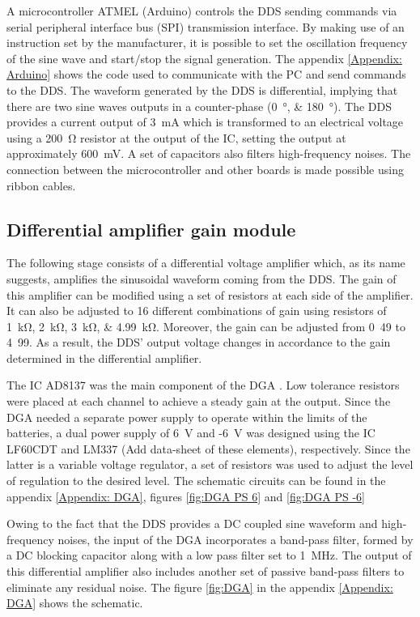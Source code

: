 A microcontroller ATMEL (Arduino) controls the DDS sending commands via serial peripheral interface bus (SPI) transmission interface. By making use of an instruction set by the manufacturer, it is possible to set the oscillation frequency of the sine wave and start/stop the signal generation. The appendix \ref{Appendix: Arduino} shows the code used to communicate with the PC and send commands to the DDS. The waveform generated by the DDS is differential, implying that there are two sine waves outputs in a counter-phase (\SIlist{0;180}{\degree}). The DDS provides a current output of \SI{3}{\mA} which is transformed to an electrical voltage using a \SI{200}{\ohm} resistor at the output of the IC, setting the output at approximately \SI{600}{\mV}. A set of capacitors also filters high-frequency noises. The connection between the microcontroller and other boards is made possible using ribbon cables. 

\subsection{Differential amplifier gain module}
The following stage consists of a differential voltage amplifier which, as its name suggests, amplifies the sinusoidal waveform coming from the DDS. The gain of this amplifier can be modified using a set of resistors at each side of the amplifier. It can also be adjusted to 16 different combinations of gain using resistors of \SIlist{1;2;3;4.99}{\kohm}. Moreover, the gain can be adjusted from \si{0.49} to \si{4.99}. As a result, the DDS' output voltage changes in accordance to the gain determined in the differential amplifier. 

The IC AD8137 was the main component of the DGA \cite{ad:AD8137}. Low tolerance resistors were placed at each channel to achieve a steady gain at the output. Since the DGA needed a separate power supply to operate within the limits of the batteries, a dual power supply of \SI{6}{\volt} and -\SI{6}{\volt} was designed using the IC LF60CDT and LM337 \rvmynote(Add data-sheet of these elements), respectively. Since the latter is a variable voltage regulator, a set of resistors was used to adjust the level of regulation to the desired level. The schematic circuits can be found in the appendix \ref{Appendix: DGA}, figures \ref{fig:DGA PS 6} and \ref{fig:DGA PS -6}

Owing to the fact that the DDS provides a DC coupled sine waveform and high-frequency noises, the input of the DGA incorporates a band-pass filter, formed by a DC blocking capacitor along with a low pass filter set to \SI{1}{\mega\hertz}. The output of this differential amplifier also includes another set of passive band-pass filters to eliminate any residual noise. The figure \ref{fig:DGA} in the appendix \ref{Appendix: DGA} shows the schematic. 

